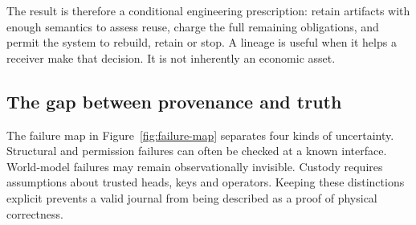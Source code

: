 \documentclass[11pt]{article}
\begin{document}
The result is therefore a conditional engineering prescription: retain artifacts with enough semantics to assess reuse, charge the full remaining obligations, and permit the system to rebuild, retain or stop. A lineage is useful when it helps a receiver make that decision. It is not inherently an economic asset.

\subsection{The gap between provenance and truth}

The failure map in Figure~\ref{fig:failure-map} separates four kinds of uncertainty. Structural and permission failures can often be checked at a known interface. World-model failures may remain observationally invisible. Custody requires assumptions about trusted heads, keys and operators. Keeping these distinctions explicit prevents a valid journal from being described as a proof of physical correctness.
\end{document}
